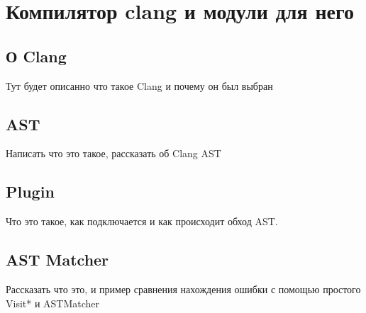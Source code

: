 \chapter{Компилятор clang и модули для него}

\section{О Clang}
Тут будет описанно что такое Clang и почему он был выбран

\section{AST}
Написать что это такое, рассказать об Clang AST

\section{Plugin}
Что это такое, как подключается и как происходит обход AST.

\section{AST Matcher}
Рассказать что это, и пример сравнения нахождения ошибки с помощью простого Visit* и ASTMatcher